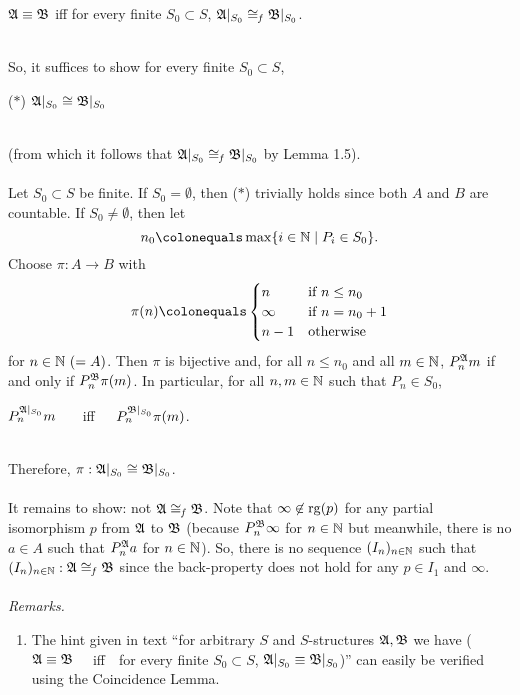 \begin{enumerate}[1.]
\centerline{$\mathfrak{A} \equiv \mathfrak{B}$ \quad iff \quad for every finite $S_0 \subset S$, ${\mathfrak{A}|_{S_0}} \cong_\mathit{f} {\mathfrak{B}|_{S_0}}$.}\\
So, it suffices to show for every finite $S_0 \subset S$,\smallskip\\
\begin{quoteno}{($\ast$)}
${\mathfrak{A}|_{S_0}} \cong {\mathfrak{B}|_{S_0}}$
\end{quoteno}\smallskip\\
(from which it follows that ${\mathfrak{A}|_{S_0}} \cong_\mathit{f} {\mathfrak{B}|_{S_0}}$ by Lemma 1.5).\\
\ \\
Let $S_0 \subset S$ be finite. If $S_0 = \emptyset$, then ($\ast$) trivially holds since both $A$ and $B$ are countable. If $S_0 \neq \emptyset$, then let
\[
n_0 \colonequals \max \setm{i \in \nat}{P_i \in S_0}.
\]
Choose $\pi : A \to B$ with
\[
\pi(n) \colonequals \begin{cases}
n      & \mbox{if \(n \leq n_0\)} \cr
\infty & \mbox{if \(n = n_0 + 1\)} \cr
n - 1  & \mbox{otherwise}
\end{cases}
\]
for $n \in \mathbb{N} \ (= A)$. Then $\pi$ is bijective and, for all $n \leq n_0$ and all $m \in \mathbb{N}$, $P_n^{\mathfrak{A}} m$ if and only if $P_n^{\mathfrak{B}} \pi(m)$. In particular, for all $n, m \in \mathbb{N}$ such that $P_n \in S_0$,\\
\centerline{$P_n^{\mathfrak{A}|_{S_0}} m$ \ \ \ iff\ \ \ $P_n^{\mathfrak{B}|_{S_0}} \pi(m)$.}\\
Therefore, $\pi : {\mathfrak{A}|_{S_0}} \cong {\mathfrak{B}|_{S_0}}$.\\
\ \\
It remains to show: not $\mathfrak{A} \cong_\mathit{f} \mathfrak{B}$. Note that $\infty \not\in {\mathrm{rg}(p)}$ for any partial isomorphism $p$ from $\mathfrak{A}$ to $\mathfrak{B}$ (because $P^{\mathfrak{B}}_n \infty$ for $n \in \mathbb{N}$ but meanwhile, there is no $a \in A$ such that $P^{\mathfrak{A}}_n a$ for $n \in \mathbb{N}$). So, there is no sequence $(I_n)_{n \in \mathbb{N}}$ such that $(I_n)_{n \in \mathbb{N}}: \mathfrak{A} \cong_\mathit{f} \mathfrak{B}$ since the back-property does not hold for any $p \in I_1$ and $\infty$.\\
\ \\
\textit{Remarks.}
\begin{enumerate}[(1)]
\item The hint given in text ``for arbitrary $S$ and $S$-structures $\mathfrak{A}, \mathfrak{B}$ we have ($\mathfrak{A} \equiv \mathfrak{B}$ \ \ iff\ \ for every finite $S_0 \subset S$, ${\mathfrak{A}|_{S_0}} \equiv {\mathfrak{B}|_{S_0}}$)'' can easily be verified using the Coincidence Lemma.

\end{enumerate}
\end{enumerate}
